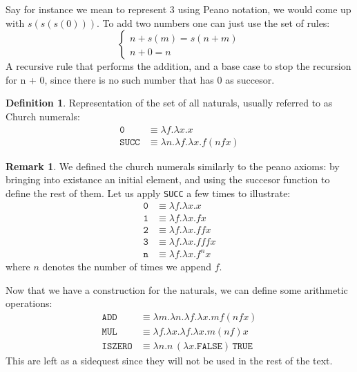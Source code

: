 \documentclass[12pt]{book}
\newcommand{\la}{\lambda}
\theoremstyle{plain}
\theoremstyle{definition}
\newtheorem{definition}{Definition}[section]
\theoremstyle{definition}
\theoremstyle{definition}
\newtheorem{remark}{Remark}
\begin{document}
Say for instance we mean to represent $ 3 $ using Peano notation, we would come up with $ s(s(s(0))) $. To add two numbers one can just use the set of rules:
\[
\begin{cases}
  n + s(m) = s(n + m) \\
  n + 0 = n
\end{cases}
\]
A recursive rule that performs the addition, and a base case to stop the recursion for n + 0, since there is no such number that has $ 0 $ as succesor.
\begin{definition} Representation of the set of all naturals, usually referred to as Church numerals:
\label{def:church-naturals}
\begin{align*}
\texttt{0} &\equiv \la f.\la x. x \\
\texttt{SUCC} &\equiv \la n. \la f. \la x . f ( n f x )
\end{align*}

\end{definition}
\begin{remark}
  We defined the church numerals similarly to the peano axioms: by bringing into existance an initial element, and using the succesor function to define the rest of them. Let us apply \texttt{SUCC} a few times to illustrate:
  \begin{align*}
    \texttt{0} &\equiv \la f.\la x. x \\
    \texttt{1} &\equiv \la f.\la x. f x \\
    \texttt{2} &\equiv \la f.\la x. f f x \\
    \texttt{3} &\equiv \la f.\la x. f f f x \\
    \texttt{n} &\equiv \la f.\la x. f ^ n x
  \end{align*}
  where $ n $ denotes the number of times we append $ f $.
\end{remark}
Now that we have a construction for the naturals, we can define some arithmetic operations:
\begin{align*}
  \texttt{ADD} &\equiv \la m.\la n. \la f. \la x. m f ( n f x) \\
  \texttt{MUL} &\equiv \la f.\la x. \la f. \la x. m (n f) x \\
  \texttt{ISZERO} &\equiv \lambda n. n\,(\lambda x.\texttt{FALSE})\,\texttt{TRUE}
\end{align*}
This are left as a sidequest since they will not be used in the rest of the text.
\end{document}

